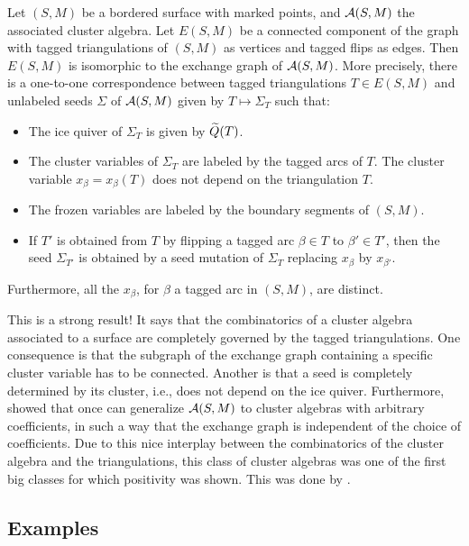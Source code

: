 \begin{theorem}\label{thm:clusters_and_triangulations}

	Let $(S, M)$ be a bordered surface with marked points, and $\mathcal{A}(S, M)$ the associated
	cluster algebra. Let $E(S, M)$ be a connected component of the graph with tagged
	triangulations of $(S, M)$ as vertices and tagged flips as edges. Then $E(S, M)$ is
	isomorphic to the exchange graph of $\mathcal{A}(S, M)$. More precisely, there is a one-to-one
	correspondence between tagged triangulations $T \in E(S, M)$ and unlabeled seeds
	$\Sigma$ of $\mathcal{A}(S, M)$ given by $T \mapsto \Sigma_T$ such that:
	\begin{itemize}
		\item The ice quiver of $\Sigma_T$ is given by $\widetilde{Q}(T)$.
		\item The cluster variables of $\Sigma_T$ are labeled by the tagged arcs of $T$. The cluster
		      variable $x_\beta = x_\beta(T)$ does not depend on the triangulation $T$.
		\item The frozen variables are labeled by the boundary segments of $(S, M)$.
		\item If $T'$ is obtained from $T$ by flipping a tagged arc $\beta \in T$ to $\beta' \in T'$,
		      then the seed $\Sigma_{T'}$ is obtained by a seed mutation of $\Sigma_T$ replacing
		      $x_{\beta}$ by $x_{\beta'}$.
	\end{itemize}
	Furthermore, all the $x_\beta$, for $\beta$ a tagged arc in $(S,M)$, are distinct.
\end{theorem}

This is a strong result! It says that the combinatorics of a cluster algebra associated
to a surface are completely governed by the tagged triangulations. One consequence is
that the subgraph of the exchange graph containing a specific cluster variable has to
be connected. Another is that a seed is completely determined by its cluster, i.e.,
does not depend on the ice quiver. Furthermore,
\textcite{FominThurston2018CATriangulatedSurfacesII} showed that once can generalize
$\mathcal{A}(S, M)$ to cluster algebras with arbitrary coefficients, in such a way that the
exchange graph is independent of the choice of coefficients. Due to this nice interplay
between the combinatorics of the cluster algebra and the triangulations, this class of
cluster algebras was one of the first big classes for which positivity was shown. This
was done by \textcite{MusikerSchifflerWilliams2011PositivityCASurfaces}.

\subsection{Examples}